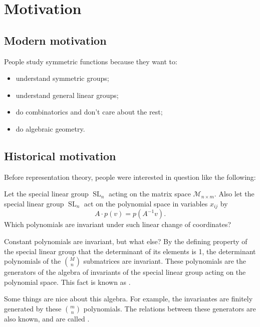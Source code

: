 \chapter{Motivation}

\section{Modern motivation}

People study symmetric functions because they want to:
\begin{itemize}
    \item understand symmetric groups;
    \item understand general linear groups;
    \item do combinatorics and don't care about the rest;
    \item do algebraic geometry.
\end{itemize}

\section{Historical motivation}

Before representation theory, people were interested in question like the following:

\begin{question}
    Let the special linear group \(\operatorname{SL}_n\) acting on the matrix space \(\mathcal{M}_{n \times m}\).
    Also let the special linear group \(\operatorname{SL}_n\) act on the polynomial space in variables \(x_{ij}\) by
    \begin{equation*}
        A \cdot p(v) = p(A^{-1}v).
    \end{equation*}
    Which polynomials are invariant under such linear change of coordinates?
\end{question}

Constant polynomials are invariant, but what else?
By the defining property of the special linear group that the determinant of its elements is 1,
the determinant polynomials of the \(\binom{M}{n}\) submatrices are invariant.
These polynomials are the generators of the algebra of invariants of the special linear group acting on the polynomial space.
This fact is known as .

Some things are nice about this algebra.
For example, the invariantes are finitely generated by these \(\binom{m}{n}\) polynomials.
The relations between these generators are also known,
and are called .

